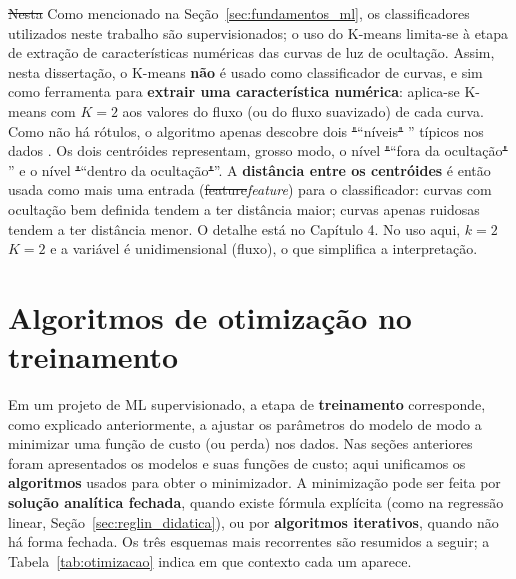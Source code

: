 \documentclass[msc]{on} %
\makeatletter
\providecommand{\DIFaddtex}[1]{{\protect\color{red}#1}} %
\providecommand{\DIFdeltex}[1]{{\protect\color{red}\sout{#1}}} %
\providecommand{\DIFaddbegin}{} %
\providecommand{\DIFaddend}{} %
\providecommand{\DIFdelbegin}{} %
\providecommand{\DIFdelend}{} %
\providecommand{\DIFadd}[1]{\texorpdfstring{\DIFaddtex{#1}}{#1}} %
\providecommand{\DIFdel}[1]{\texorpdfstring{\DIFdeltex{#1}}{}} %
\let\sout@orig\sout %
\renewcommand{\sout}[1]{\ifmmode\text{\sout@orig{\ensuremath{#1}}}\else\sout@orig{#1}\fi} %
\makeatother
\begin{document}
\DIFdelbegin \DIFdel{Nesta }\DIFdelend \DIFaddbegin \DIFadd{Como mencionado na Seção~\ref{sec:fundamentos_ml}, os classificadores utilizados neste trabalho são supervisionados; o uso do K-means limita-se à etapa de extração de características numéricas das curvas de luz de ocultação. Assim, nesta }\DIFaddend dissertação, o K-means \textbf{não} é usado como classificador de curvas, e sim como ferramenta para \textbf{extrair uma característica numérica}: aplica-se K-means com \(K=2\) aos valores do fluxo (ou do fluxo suavizado) de cada curva. Como não há rótulos, o algoritmo apenas descobre dois \DIFdelbegin \DIFdel{"}\DIFdelend \DIFaddbegin \DIFadd{``}\DIFaddend níveis\DIFdelbegin \DIFdel{" }\DIFdelend \DIFaddbegin \DIFadd{'' }\DIFaddend típicos nos dados \citep{Levada2026}. Os dois centróides representam, grosso modo, o nível \DIFdelbegin \DIFdel{"}\DIFdelend \DIFaddbegin \DIFadd{``}\DIFaddend fora da ocultação\DIFdelbegin \DIFdel{" }\DIFdelend \DIFaddbegin \DIFadd{'' }\DIFaddend e o nível \DIFdelbegin \DIFdel{"}\DIFdelend \DIFaddbegin \DIFadd{``}\DIFaddend dentro da ocultação\DIFdelbegin \DIFdel{"}\DIFdelend \DIFaddbegin \DIFadd{''}\DIFaddend . A \textbf{distância entre os centróides} é então usada como mais uma entrada (\DIFdelbegin \DIFdel{feature}\DIFdelend \DIFaddbegin \textit{\DIFadd{feature}}\DIFaddend ) para o classificador: curvas com ocultação bem definida tendem a ter distância maior; curvas apenas ruidosas tendem a ter distância menor. O detalhe está no Capítulo 4. No uso aqui, \DIFdelbegin \DIFdel{\(k=2\) }\DIFdelend \DIFaddbegin \DIFadd{\(K=2\) }\DIFaddend e a variável é unidimensional (fluxo), o que simplifica a interpretação.

\section{Algoritmos de otimização no treinamento}
\label{sec:otimizacao}

Em um projeto de ML supervisionado, a etapa de \textbf{treinamento} corresponde, como explicado anteriormente, a ajustar os parâmetros do modelo de modo a minimizar uma função de custo (ou perda) nos dados. Nas seções anteriores foram apresentados os modelos e suas funções de custo; aqui unificamos os \textbf{algoritmos} usados para obter o minimizador. A minimização pode ser feita por \textbf{solução analítica fechada}, quando existe fórmula explícita (como na regressão linear, Seção~\ref{sec:reglin_didatica}), ou por \textbf{algoritmos iterativos}, quando não há forma fechada. Os três esquemas mais recorrentes são resumidos a seguir; a Tabela~\ref{tab:otimizacao} indica em que contexto cada um aparece.
\end{document}

